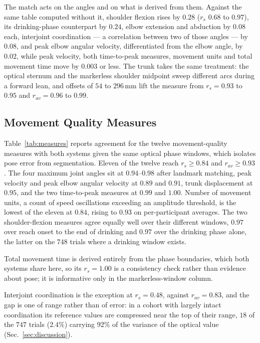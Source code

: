 \documentclass[conference]{IEEEtran}
\begin{document}
The match acts on the angles and on what is derived from them. Against the same
table computed without it, shoulder flexion rises by $0.28$ ($r_s$ $0.68$ to
$0.97$), its drinking-phase counterpart by $0.24$, elbow extension and abduction
by $0.08$ each, interjoint coordination --- a correlation between two of those
angles --- by $0.08$, and peak elbow angular velocity, differentiated from the
elbow angle, by $0.02$, while peak velocity, both time-to-peak measures, movement
units and total movement time move by $0.003$ or less. The trunk takes the same
treatment: the optical sternum and the markerless shoulder midpoint sweep
different arcs during a forward lean, and offsets of $54$ to $296$\,mm lift the
measure from $r_s = 0.93$ to $0.95$ and $r_{av} = 0.96$ to $0.99$.

\subsection{Movement Quality Measures}
\label{sec:results-measures}
Table~\ref{tab:measures} reports agreement for the twelve movement-quality
measures with both systems given the same optical phase windows, which isolates
pose error from segmentation. Eleven of the twelve reach
$r_s \ge 0.84$ and $r_{av} \ge 0.93$. The four maximum joint angles sit at
$0.94$--$0.98$ after landmark matching, peak velocity and peak elbow angular
velocity at $0.89$ and $0.91$, trunk displacement at $0.95$, and the two
time-to-peak measures at $0.99$ and $1.00$. Number of movement units, a count
of speed oscillations exceeding an amplitude threshold, is the lowest of the eleven at
$0.84$, rising to $0.93$ on per-participant averages. The two shoulder-flexion
measures agree equally well over their different windows, $0.97$ over reach
onset to the end of drinking and $0.97$ over the drinking phase alone, the
latter on the $748$ trials where a drinking window exists.

Total movement time is derived entirely from the phase boundaries, which both
systems share here, so its $r_s = 1.00$ is a consistency check rather than
evidence about pose; it is informative only in the markerless-window column.

Interjoint coordination is the exception at $r_s = 0.48$, against $r_{av} =
0.83$, and the gap is one of range rather than of error: in a cohort with largely
intact coordination its reference values are compressed near the top of their
range, $18$ of the $747$ trials ($2.4\%$) carrying $92\%$ of the variance of the
optical value (Sec.~\ref{sec:discussion}).
\end{document}
